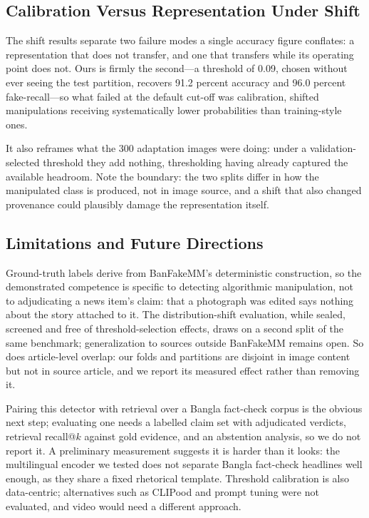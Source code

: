 \documentclass[conference,a4paper]{IEEEtran}
\begin{document}
\subsection{Calibration Versus Representation Under Shift}

The shift results separate two failure modes a single accuracy figure
conflates: a representation that does not transfer, and one that transfers
while its operating point does not. Ours is firmly the second---a threshold of
0.09, chosen without ever seeing the test partition, recovers 91.2 percent
accuracy and 96.0 percent fake-recall---so what failed at the default cut-off
was calibration, shifted manipulations receiving systematically lower
probabilities than training-style ones.

It also reframes what the 300 adaptation images were doing: under a
validation-selected threshold they add nothing, thresholding having already
captured the available headroom. Note the boundary: the two splits differ in how the
manipulated class is produced, not in image source, and a shift that also
changed provenance could plausibly damage the representation itself.

\subsection{Limitations and Future Directions}
\label{sec:limitations}

Ground-truth labels derive from BanFakeMM's deterministic construction, so the
demonstrated competence is specific to detecting algorithmic manipulation, not
to adjudicating a news item's claim: that a photograph was edited says nothing
about the story attached to it. The
distribution-shift evaluation, while sealed, screened and
free of threshold-selection effects, draws on a second split of the same
benchmark; generalization to sources outside BanFakeMM remains open. So does
article-level overlap: our folds and partitions are disjoint in image content
but not in source article, and we report its measured effect rather than
removing it.

Pairing this detector with retrieval over a Bangla fact-check corpus is the
obvious next step; evaluating one needs a labelled claim set with adjudicated
verdicts, retrieval recall@$k$ against gold evidence, and an abstention
analysis, so we do not report it. A preliminary measurement suggests it is
harder than it looks: the multilingual encoder we tested does not separate
Bangla fact-check headlines well enough, as they share a fixed rhetorical
template. Threshold calibration is also data-centric; alternatives such as
CLIPood \cite{clipood} and prompt tuning \cite{dpod} were not evaluated, and
video would need a different approach.
\end{document}

